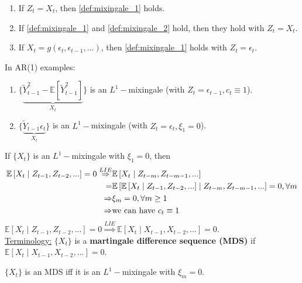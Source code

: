 \documentclass[11pt]{elegantbook}
\begin{document}
\begin{remark}
    \begin{enumerate}
        \item If $Z_t=X_t$, then \ref{def:mixingale_1} holds.
        \item If \ref{def:mixingale_1} and \ref{def:mixingale_2} hold, then they hold with $Z_t=X_t$.
        \item If $X_t=g\left(\epsilon_t,\epsilon_{t-1},...\right)$, then \ref{def:mixingale_1} holds with $Z_t=\epsilon_t$.
    \end{enumerate}
    In AR(1) examples:
    \begin{enumerate}
        \item $\{\underbrace{\tilde{Y}_{t-1}^2-\mathbb{E}[\tilde{Y}_{t-1}^2]}_{X_t}\}$ is an $L^1-$mixingale (with $Z_t=\epsilon_{t-1},c_t\equiv 1$).
        \item $\{\underbrace{\tilde{Y}_{t-1}\epsilon_t}_{X_t}\}$ is an $L^1-$mixingale (with $Z_t=\epsilon_t,\xi_1=0$).
    \end{enumerate}
    \begin{example}
        If $\{X_t\}$ is an $L^1-$mixingale with $\xi_1=0$, then
        \begin{equation}
            \begin{aligned}
                \mathbb{E}\left[X_t\mid Z_{t-1},Z_{t-2},...\right]=0 \stackrel{LIE}{\Rightarrow} &\mathbb{E}\left[X_t\mid Z_{t-m},Z_{t-m-1},...\right]\\
                =&\mathbb{E}\left[\mathbb{E}\left[X_t\mid Z_{t-1},Z_{t-2},...\right]\mid Z_{t-m},Z_{t-m-1},...\right]=0,\forall m\\
                \Rightarrow & \xi_m=0,\forall m\geq 1\\
                \Rightarrow &\textnormal{we can have } c_t\equiv 1
            \end{aligned}
            \nonumber
        \end{equation}
        $\mathbb{E}\left[X_t\mid Z_{t-1},Z_{t-2},...\right]=0 \stackrel{LIE}{\Rightarrow} \mathbb{E}\left[X_t\mid X_{t-1},X_{t-2},...\right]=0$.\\
        \underline{Terminology:} $\{X_t\}$ is a \textbf{martingale difference sequence (MDS)} if $\mathbb{E}\left[X_t\mid X_{t-1},X_{t-2},...\right]=0$.\\
        \begin{definition}
            $\{X_t\}$ is an MDS iff it is an $L^1-$mixingale with $\xi_m=0$.
        \end{definition}

\end{example}
\end{remark}
\end{document}
